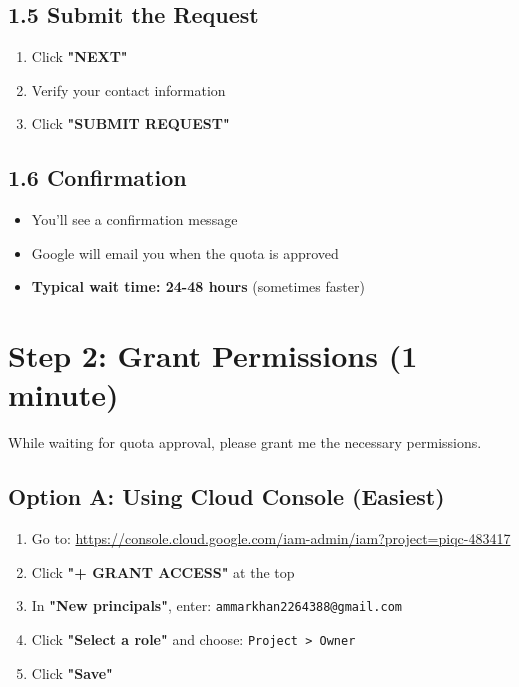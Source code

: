 \documentclass[11pt,a4paper]{article}
\begin{document}
\subsection{1.5 Submit the Request}

\begin{enumerate}
    \item Click \textbf{"NEXT"}
    \item Verify your contact information
    \item Click \textbf{"SUBMIT REQUEST"}
\end{enumerate}

\subsection{1.6 Confirmation}

\begin{itemize}
    \item You'll see a confirmation message
    \item Google will email you when the quota is approved
    \item \textbf{Typical wait time: 24-48 hours} (sometimes faster)
\end{itemize}

\section{Step 2: Grant Permissions (1 minute)}

While waiting for quota approval, please grant me the necessary permissions.

\subsection{Option A: Using Cloud Console (Easiest)}

\begin{enumerate}
    \item Go to: \url{https://console.cloud.google.com/iam-admin/iam?project=piqc-483417}
    \item Click \textbf{"+ GRANT ACCESS"} at the top
    \item In \textbf{"New principals"}, enter: \texttt{ammarkhan2264388@gmail.com}
    \item Click \textbf{"Select a role"} and choose: \texttt{Project > Owner}
    \item Click \textbf{"Save"}
\end{enumerate}
\end{document}
